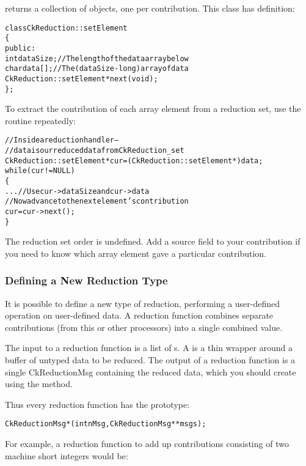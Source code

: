  returns a collection of 
objects, one per contribution.  This class has definition:

\begin{alltt}
class CkReduction::setElement 
\{
public:
  int dataSize;//The length of the data array below
  char data[];//The (dataSize-long) array of data
  CkReduction::setElement *next(void);
\};
\end{alltt}

To extract the contribution of each array element from a reduction set, use the
 routine repeatedly:

\begin{alltt}
  //Inside a reduction handler-- 
  //  data is our reduced data from CkReduction_set
  CkReduction::setElement *cur=(CkReduction::setElement *)data;
  while (cur!=NULL)
  \{
    ... //Use cur->dataSize and cur->data
    //Now advance to the next element's contribution
    cur=cur->next();
  \}
\end{alltt}

The reduction set order is undefined.  Add a source field to your contribution
if you need to know which array element gave a particular contribution.

\subsubsection{Defining a New Reduction Type}
\label{new_type_reduction}

It is possible to define a new type of reduction, performing a 
user-defined operation on user-defined data.  A reduction function
combines separate contributions (from this or other processors)
into a single combined value.

The input to a reduction function is a list of s.
A  is a thin wrapper around a buffer of untyped data
to be reduced.  
The output of a reduction function is a single CkReductionMsg
containing the reduced data, which you should create using the
 method.  

Thus every reduction function has the prototype:
\begin{alltt}
CkReductionMsg *(int nMsg,CkReductionMsg **msgs);
\end{alltt}

For example, a reduction function to add up contributions 
consisting of two machine short integers would be:

